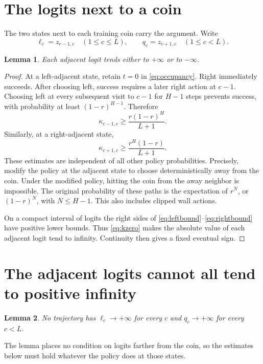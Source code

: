 \documentclass[11pt]{article}
\newtheorem{lemma}{Lemma}
\newcommand{\kap}{\kappa}
\begin{document}
\section{The logits next to a coin}
The two states next to each training coin carry the argument. Write
\[
 \ell_c=z_{c-1,c}\quad(1\le c\le L),\qquad
 q_c=z_{c+1,c}\quad(1\le c<L).
\]
\begin{lemma}\label{lem:signs}
Each adjacent logit tends either to $+\infty$ or to $-\infty$.
\end{lemma}
\begin{proof}
At a left-adjacent state, retain $t=0$ in \eqref{eq:occupancy}. Right
immediately succeeds. After choosing left, success requires a later right
action at $c-1$. Choosing left at every subsequent visit to $c-1$ for $H-1$
steps prevents success, with probability at least $(1-r)^{H-1}$. Therefore
\begin{equation}\label{eq:leftbound}
 \kap_{c-1,c}\ge\frac{r(1-r)^H}{L+1}.
\end{equation}
Similarly, at a right-adjacent state,
\begin{equation}\label{eq:rightbound}
 \kap_{c+1,c}\ge\frac{r^H(1-r)}{L+1}.
\end{equation}
These estimates are independent of all other policy probabilities. Precisely,
modify the policy at the adjacent state to choose deterministically away from
the coin. Under the modified policy, hitting the coin from the away neighbor
is impossible. The original probability of these paths is the expectation of
$r^N$, or $(1-r)^N$, with $N\le H-1$. This also includes clipped wall actions.

On a compact interval of logits the right sides of
\eqref{eq:leftbound}--\eqref{eq:rightbound} have positive lower bounds.
Thus \eqref{eq:kzero} makes the absolute value of each adjacent logit tend to
infinity. Continuity then gives a fixed eventual sign.
\end{proof}

\section{The adjacent logits cannot all tend to positive infinity}
\begin{lemma}\label{lem:exclude}
No trajectory has $\ell_c\to+\infty$ for every $c$ and $q_c\to+\infty$
for every $c<L$.
\end{lemma}
The lemma places no condition on logits farther from the coin, so the
estimates below must hold whatever the policy does at those states.
\end{document}
